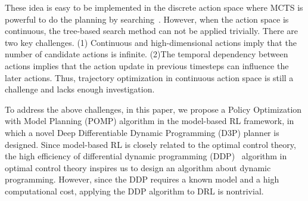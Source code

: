 \documentclass{article} %
\newcommand{\lijun}[1]{ {#1}}
\begin{document}
These idea is easy to be implemented in the discrete action space  where MCTS is powerful to do the planning by searching~\citep{silver2016mastering,silver2017mastering,schrittwieser2020mastering,hubert2021learning}.
However, when the action space is continuous, the tree-based search method can not be applied trivially. 
There are two key challenges. 
(1) Continuous and high-dimensional actions imply that the number of candidate actions is infinite. 
(2)The temporal dependency between actions implies that the action update in previous timesteps can influence the later actions. Thus, trajectory optimization in continuous action space is still a challenge and lacks enough investigation. 

To address the above challenges, in this paper, we propose a Policy Optimization with Model Planning (POMP) algorithm in the model-based RL framework, in which a novel Deep Differentiable Dynamic Programming (D3P) planner is designed.     \lijun{Since model-based RL is  closely related to the optimal control theory, the high efficiency of differential dynamic programming (DDP)~\citep{de1988differential,tassa2012synthesis} algorithm in optimal control theory inspires us to design an algorithm about dynamic programming. However, since the DDP requires a known model and a high computational cost, applying the DDP  algorithm to DRL is nontrivial.}

\end{document}
